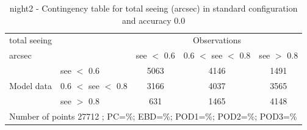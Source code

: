 \begin{table}[p!]
\begin{center}
\begin{tabular}{llccc}
\hline
{total seeing}                                       &                                                    & \multicolumn{3}{c}{Observations}                 \\
{arcsec}                                       &                             & see $<$ 0.6   & 0.6 $<$ see $<$ 0.8 & see $>$ 0.8 \\
\hline
\multicolumn{1}{c}{\multirow{3}{*}{Model data}}  & see $<$ 0.6             & 5063                & 4146                       & 1491              \\
                                                 & 0.6  $<$ see $<$ 0.8 & 3166                & 4037                       & 3565              \\
                                                 & see $>$ 0.8             & 631                & 1465                       & 4148              \\
\hline
\multicolumn{5}{l}{ Number of points        27712 ; PC=\%; EBD=\%; POD1=\%; POD2=\%; POD3=\%}
\end{tabular}
\end{center}
\caption{night2 - Contingency table for  total seeing (arcsec) in standard configuration and accuracy 0.0}
\label{tab:contingencyseeBEF:night2}
\end{table}
